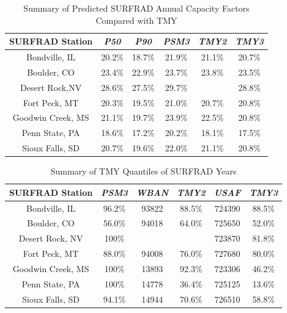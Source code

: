 \documentclass[conference]{IEEEtran}
\begin{document}
\begin{table}[htbp]
\caption{Summary of Predicted SURFRAD Annual Capacity Factors Compared with TMY}
\begin{center}
\begin{tabular}{|c|c|c|c|c|c|}
\hline
\textbf{SURFRAD Station} & \textbf{\textit{P50}}& \textbf{\textit{P90}}& \textbf{\textit{PSM3}}& \textbf{\textit{TMY2}}& \textbf{\textit{TMY3}} \\
\hline
Bondville, IL    & 20.2\%& 18.7\%& 21.9\%& 21.1\%& 20.7\% \\
Boulder, CO      & 23.4\%& 22.9\%& 23.7\%& 23.8\%& 23.5\% \\
Desert Rock,NV   & 28.6\%& 27.5\%& 29.7\%&       & 28.8\% \\
Fort Peck, MT    & 20.3\%& 19.5\%& 21.0\%& 20.7\%& 20.8\% \\
Goodwin Creek, MS& 21.1\%& 19.7\%& 23.9\%& 22.5\%& 20.8\% \\
Penn State, PA   & 18.6\%& 17.2\%& 20.2\%& 18.1\%& 17.5\% \\
Sioux Falls, SD  & 20.7\%& 19.6\%& 22.0\%& 21.1\%& 20.8\% \\
\hline
\end{tabular}
\label{table:surfrad-tmy-summary}
\end{center}
\end{table}

\begin{table}[htbp]
\caption{Summary of TMY Quantiles of SURFRAD Years}
\begin{center}
\begin{tabular}{|c|c|c|c|c|c|}
\hline
\textbf{SURFRAD Station} & \textbf{\textit{PSM3}}& \textbf{\textit{WBAN}}& \textbf{\textit{TMY2}}& \textbf{\textit{USAF}}& \textbf{\textit{TMY3}} \\
\hline
Bondville, IL    & 96.2\%& 93822&  88.5\%&724390&  88.5\% \\
Boulder, CO      & 56.0\%& 94018&  64.0\%&725650&  52.0\% \\
Desert Rock, NV  & 100\% &      &        &723870&  81.8\% \\
Fort Peck, MT    & 88.0\%& 94008&  76.0\%&727680&  80.0\% \\
Goodwin Creek, MS& 100\% & 13893&  92.3\%&723306&  46.2\% \\
Penn State, PA   & 100\% & 14778&  36.4\%&725125&  13.6\% \\
Sioux Falls, SD  & 94.1\%& 14944&  70.6\%&726510&  58.8\% \\
\hline
\end{tabular}
\label{table:surfrad-tmy-quantile-summary}
\end{center}
\end{table}
\end{document}
